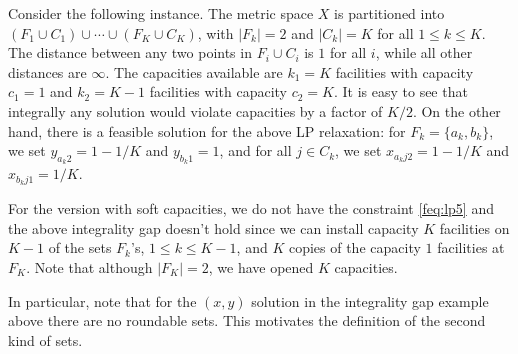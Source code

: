 \begin{remark} \label{frem:ig}
Consider the following instance. The metric space $X$ is partitioned into $(F_1\cup C_1) \cup \cdots \cup (F_K\cup C_K)$, with $|F_k| = 2$ and $|C_k| = K$ for all $1\le k\le K$.
The distance between any two points in $F_i\cup C_i$ is $1$ for all $i$, while all other distances are $\infty$. The capacities available are $k_1 = K$ facilities with capacity $c_1 = 1$ and
$k_2= K-1$ facilities with capacity $c_2 = K$. It is easy to see that integrally any solution would violate capacities by a factor of $K/2$.
On the other hand, there is a feasible solution for the above LP relaxation: for $F_k = \{a_k,b_k\}$, we set $y_{a_k2} = 1-1/K$ and $y_{b_k1} = 1$, and for all $j\in C_k$, we set $x_{a_kj2} = 1-1/K$ and $x_{b_kj1} = 1/K$.


 For the version with soft capacities, we do not have the constraint \eqref{feq:lp5} and the above integrality gap doesn't hold since we can install capacity $K$ facilities on $K-1$ of the sets $F_k$'s, $1\leq k\leq K-1$, and $K$ copies of the capacity $1$ facilities at $F_K$. Note that although $|F_K| = 2$, we have opened $K$ capacities.
\end{remark}

In particular, note that for the $(x,y)$ solution in the integrality gap example above there are no roundable sets. This motivates the definition of the second kind of sets.

